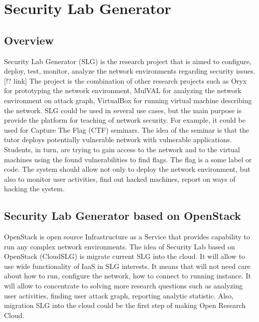 %


\section{Security Lab Generator}

\subsection{Overview}

Security Lab Generator (SLG) is the research project that is aimed to configure, deploy, test, monitor, analyze the network environments regarding security issues. [!? link] The project is the combination of other research projects such as Oryx for prototyping the network environment, MulVAL for analyzing the network environment on attack graph, VirtualBox for running virtual machine describing the network. SLG could be used in several use cases, but the main purpose is provide the platform for teaching of network security. For example, it could be used for Capture The Flag (CTF) seminars. The idea of the seminar is that the tutor deploys potentially vulnerable network with vulnerable applications. Students, in turn, are trying to gain access to the network and to the virtual machines using the found vulnerabilities to find flags. The flag is a some label or code. The system should allow not only to deploy the network environment, but also to monitor user activities, find out hacked machines, report on ways of hacking the system. 



\subsection{Security Lab Generator based on OpenStack}
OpenStack is open source Infrastructure as a Service that provides capability to run any complex network environments. The idea of Security Lab based on OpenStack (CloudSLG) is migrate current SLG into the cloud. It will allow to use wide functionality of IaaS in SLG interests. It means that will not need care about how to run, configure the network, how to connect to running instance. It will allow to concentrate to solving more research questions such as analyzing user activities, finding user attack graph, reporting analytic statistic. Also, migration SLG into the cloud could be the first step of making Open Research Cloud.    



% 